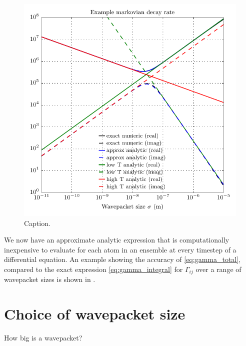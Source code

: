 \begin{figure}[t]
    \centerfloat
    \includegraphics{figures/hidden_variables/decoherence_rate_example.pdf}
    \caption{Caption.}\label{fig:decoherence_rate_example}
\end{figure}

We now have an approximate analytic expression that is computationally inexpensive to evaluate for each atom in an ensemble at every timestep of a differential equation.
An example showing the accuracy of \eqref{eq:gamma_total}, compared to the exact expression \eqref{eq:gamma_integral} for $\Gamma_{ij}$ over a range of wavepacket sizes is shown in .

\section{Choice of wavepacket size}

How big is a wavepacket?
